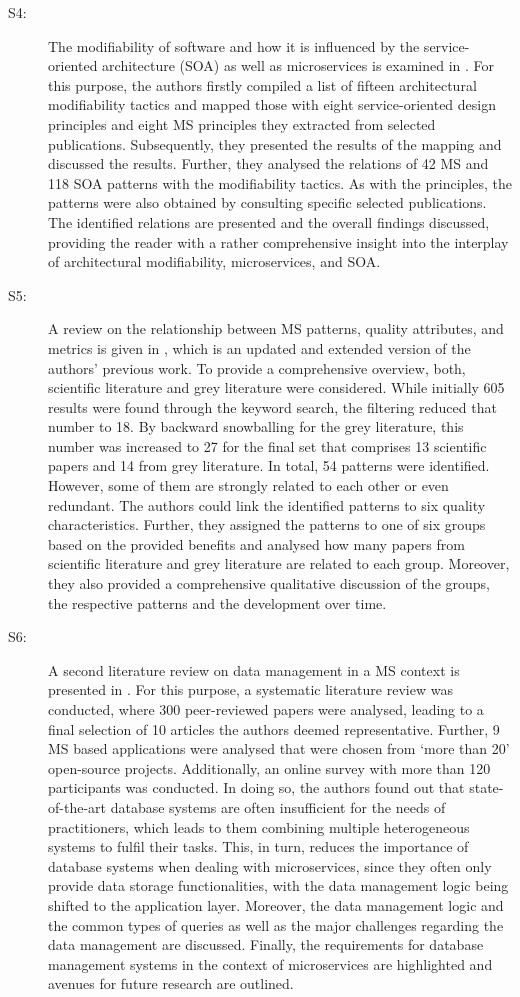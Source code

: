 \documentclass{bmcart}
\begin{document}
\begin{description}
  \item[S4:] The modifiability of software and how it is influenced by the service-oriented architecture (SOA) as well as microservices is examined in \cite{Bogner.2019}. For this purpose, the authors firstly compiled a list of fifteen architectural modifiability tactics and mapped those with eight service-oriented design principles and eight MS principles they extracted from selected publications. Subsequently, they presented the results of the mapping and discussed the results. Further, they analysed the relations of 42 MS and 118 SOA patterns with the modifiability tactics. As with the principles, the patterns were also obtained by consulting specific selected publications. The identified relations are presented and the overall findings discussed, providing the reader with a rather comprehensive insight into the interplay of architectural modifiability, microservices, and SOA.
  \item[S5:] A review on the relationship between MS patterns, quality attributes, and metrics is given in \cite{Valdivia.2020}, which is an updated and extended version of the authors' previous work. To provide a comprehensive overview, both, scientific literature and grey literature were considered. While initially 605 results were found through the keyword search, the filtering reduced that number to 18. By backward snowballing for the grey literature, this number was increased to 27 for the final set that comprises 13 scientific papers and 14 from grey literature. In total, 54 patterns were identified. However, some of them are strongly related to each other or even redundant. The authors could link the identified patterns to six quality characteristics. Further, they assigned the patterns to one of six groups based on the provided benefits and analysed how many papers from scientific literature and grey literature are related to each group. Moreover, they also provided a comprehensive qualitative discussion of the groups, the respective patterns and the development over time.
  \item[S6:] A second literature review on data management in a MS context is presented in \cite{Laigner.2021}. For this purpose, a systematic literature review was conducted, where 300 peer-reviewed papers were analysed, leading to a final selection of 10 articles the authors deemed representative. Further, 9 MS based applications were analysed that were chosen from `more than 20' \cite{Laigner.2021} open-source projects. Additionally, an online survey with more than 120 participants was conducted. In doing so, the authors found out that state-of-the-art database systems are often insufficient for the needs of practitioners, which leads to them combining multiple heterogeneous systems to fulfil their tasks. This, in turn, reduces the importance of database systems when dealing with microservices, since they often only provide data storage functionalities, with the data management logic being shifted to the application layer. Moreover, the data management logic and the common types of queries as well as the major challenges regarding the data management are discussed. Finally, the requirements for database management systems in the context of microservices are highlighted and avenues for future research are outlined.

\end{description}
\end{document}
